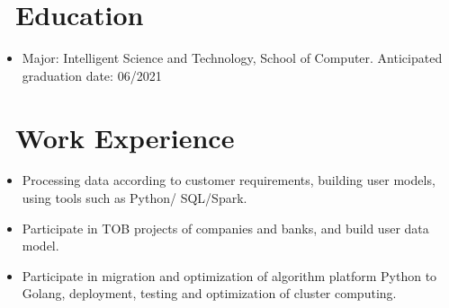 \documentclass{resume}
\newcommand{\en}[1]{#1}
\newcommand{\zh}[1]{}
\begin{document}
\name{\en{Ximing Sheng}\zh{盛熙铭}}

\section{\faGraduationCap\ \en{Education}\zh{教育经历}}
\en{}
\zh{\datedsubsection{\textbf{北京邮电大学}, 在读本科}{2017/08 -- 至今}}
\begin{itemize}
      \item \en{Major: Intelligent Science and Technology, School of Computer. Anticipated graduation date: 06/2021}
            \zh{智能科学与技术，计算机学院，2021年6月毕业}
\end{itemize}

\section{\faUsers\ \en{Work Experience}\zh{工作经历}}
\en{}
\zh{\datedsubsection{\textbf{\href{http://www.4paradigm.com/}{第四范式（北京）技术有限公司（4Paradigm Inc.）}}}{2018/07 -- 2018/08}}
\en{}
\zh{\role{模型搭建}{应用建模实习生}}
\begin{itemize}
      \item \en{Processing data according to customer requirements, building user models, using tools such as Python/ SQL/Spark.}
            \zh{根据客户需求进行数据处理，建模用户模型，使用Python/Sql/spark等工具
            }
      \item \en{Participate in TOB projects of companies and banks, and build user data model.}
            \zh{参与公司与银行ToB项目，搭建用户数据模型}
\end{itemize}

\en{}
\zh{\datedsubsection{\textbf{\href{https://m.tsingj.com/}{华控清交信息科技（北京）有限公司（“华控清交”）}}}{2020/10 -- 至今}}
\en{}
\zh{\role{集群计算}{集群研发实习}}
\begin{itemize}
      \item \en{Participate in migration and optimization of algorithm platform Python to Golang, deployment, testing and optimization of cluster computing.}
            \zh{参与算法平台Python至Golang的迁移与优化，集群计算的部署、测试与优化}
\end{itemize}
\end{document}

